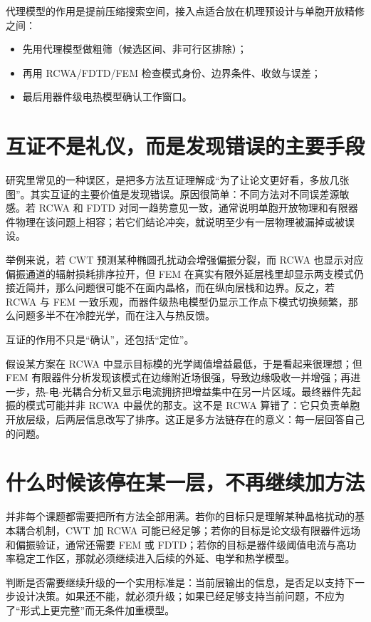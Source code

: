 代理模型的作用是提前压缩搜索空间，接入点适合放在机理预设计与单胞开放精修之间：
\begin{itemize}
  \item 先用代理模型做粗筛（候选区间、非可行区排除）；
  \item 再用 RCWA/FDTD/FEM 检查模式身份、边界条件、收敛与误差；
  \item 最后用器件级电热模型确认工作窗口。
\end{itemize}

\section{互证不是礼仪，而是发现错误的主要手段}
研究里常见的一种误区，是把多方法互证理解成“为了让论文更好看，多放几张图”。其实互证的主要价值是发现错误。原因很简单：不同方法对不同误差源敏感。若 RCWA 和 FDTD 对同一趋势意见一致，通常说明单胞开放物理和有限器件物理在该问题上相容；若它们结论冲突，就说明至少有一层物理被漏掉或被误设。

举例来说，若 CWT 预测某种椭圆孔扰动会增强偏振分裂，而 RCWA 也显示对应偏振通道的辐射损耗排序拉开，但 FEM 在真实有限外延层栈里却显示两支模式仍接近简并，那么问题很可能不在面内晶格，而在纵向层栈和边界。反之，若 RCWA 与 FEM 一致乐观，而器件级热电模型仍显示工作点下模式切换频繁，那么问题多半不在冷腔光学，而在注入与热反馈。

互证的作用不只是“确认”，还包括“定位”。

假设某方案在 RCWA 中显示目标模的光学阈值增益最低，于是看起来很理想；但 FEM 有限器件分析发现该模式在边缘附近场很强，导致边缘吸收一并增强；再进一步，热-电-光耦合分析又显示电流拥挤把增益集中在另一片区域。最终器件先起振的模式可能并非 RCWA 中最优的那支。这不是 RCWA 算错了：它只负责单胞开放层级，后两层信息改写了排序。这正是多方法链存在的意义：每一层回答自己的问题。

\section{什么时候该停在某一层，不再继续加方法}
并非每个课题都需要把所有方法全部用满。若你的目标只是理解某种晶格扰动的基本耦合机制，CWT 加 RCWA 可能已经足够；若你的目标是论文级有限器件远场和偏振验证，通常还需要 FEM 或 FDTD；若你的目标是器件级阈值电流与高功率稳定工作区，那就必须继续进入后续的外延、电学和热学模型。

判断是否需要继续升级的一个实用标准是：当前层输出的信息，是否足以支持下一步设计决策。如果还不能，就必须升级；如果已经足够支持当前问题，不应为了“形式上更完整”而无条件加重模型。

